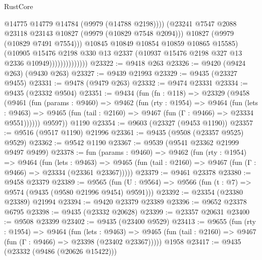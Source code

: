 \begin{lexlean}{RustCore}
\begin{coremodule}
                                    @14775
                                    @14779
                                    @14784
                                    (@9979 (@14788 @2198))))
                                (@23241
                                  @7547
                                  @2088
                                  @23118
                                  @23143
                                  @10827
                                  (@9979 (@10829 @7548 @2094)))
                                @10827
                                (@9979 (@10829 @7491 @7554)))
                              @10845
                              @10849
                              @10854
                              @10859
                              @10865
                              @15585)
                            (@10905
                              @15476
                              @2198
                              @330
                              @13
                              @2337
                              (@10937 @15476 @2198 @327 @13 @2336 @10949))))))))))))))
@23322 := @9418 @263
@23326 := @9420 (@9424 @263) (@9430 @263)
@23327 := @9439 @21993
@23329 := @9435 (@23327 @9455)
@23331 := @9478 (@9479 @263)
@23332 := @9474 @23331
@23334 := @9435 (@23332 @9504)
@23351 := @9434
    (fun (fn : @118) =>
    @23329
      (@9458
        (@9461
          (fun (params : @9460) =>
          @9462
            (fun (rty : @1954) =>
            @9464
              (fun (lets : @9463) =>
              @9465 (fun (tail : @2160) => @9467 (fun (Γ : @9466) => @23334 @9551))))))
        @9597))
    @1190
@23354 := @9603 (@23327 (@9453 @1190))
@23357 := @9516 (@9517 @1190) @21996
@23361 := @9435 (@9508 (@23357 @9525) @9529)
@23362 := @9542 @1190
@23367 := @9539 (@9541 @23362 @21999 @9497 @9499)
@23378 := fun (params : @9460) =>
  @9462
    (fun (rty : @1954) =>
    @9464
      (fun (lets : @9463) =>
      @9465 (fun (tail : @2160) => @9467 (fun (Γ : @9466) => @23334 (@23361 @23367)))))
@23379 := @9461 @23378
@23380 := @9458 @23379
@23389 := @9565
    (fun (U : @9564) => @9566 (fun (t : @7) => @9574 (@9435 (@9580 @21996 @9454) @9591)))
@23392 := @23354 (@23380 @23389) @21994
@23394 := @9420 @23379 @23389
@23396 := @9652 @23378 @6795
@23398 := @9435 (@23332 @20628)
@23399 := @23357 @20631
@23400 := @9508 @23399
@23402 := @9435 (@23400 @9529)
@23413 := @9655
    (fun (rty : @1954) =>
    @9464
      (fun (lets : @9463) =>
      @9465 (fun (tail : @2160) => @9467 (fun (Γ : @9466) => @23398 (@23402 @23367)))))
    @1958
@23417 := @9435 (@23332 (@9486 (@20626 @15422)))

\end{coremodule}
\end{lexlean}
